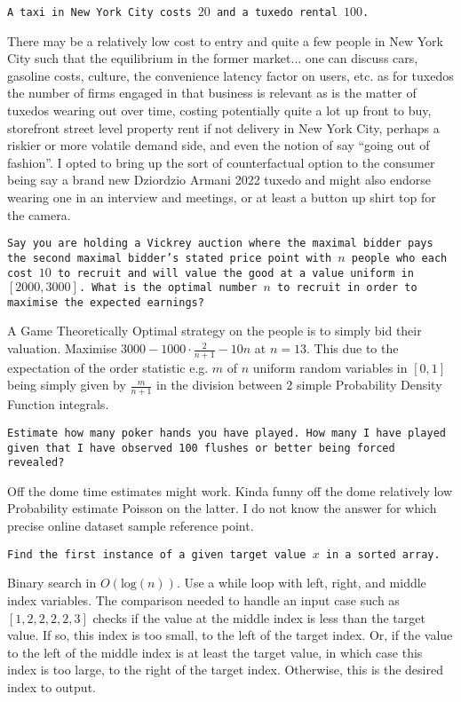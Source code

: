 \texttt{A taxi in New York City costs $20$ and a tuxedo rental $100$.}

There may be a relatively low cost to entry and quite a few people in New York City such that the equilibrium in the former market... one can discuss cars, gasoline costs, culture, the convenience latency factor on users, etc. as for tuxedos the number of firms engaged in that business is relevant as is the matter of tuxedos wearing out over time, costing potentially quite a lot up front to buy, storefront street level property rent if not delivery in New York City, perhaps a riskier or more volatile demand side, and even the notion of say ``going out of fashion''. I opted to bring up the sort of counterfactual option to the consumer being say a brand new Dziordzio Armani 2022 tuxedo and might also endorse wearing one in an interview and meetings, or at least a button up shirt top for the camera.

\texttt{Say you are holding a Vickrey auction where the maximal bidder pays the second maximal bidder's stated price point with $n$ people who each cost $10$ to recruit and will value the good at a value uniform in $[2000, 3000]$. What is the optimal number $n$ to recruit in order to maximise the expected earnings?}

A Game Theoretically Optimal strategy on the people is to simply bid their valuation. Maximise $3000 - 1000 \cdot \frac{2}{n + 1} - 10 n$ at $n = \boxed{13}$. This due to the expectation of the order statistic e.g. $m$ of $n$ uniform random variables in $[0, 1]$ being simply given by $\frac{m}{n + 1}$ in the division between $2$ simple Probability Density Function integrals.

\texttt{Estimate how many poker hands you have played. How many I have played given that I have observed 100 flushes or better being forced revealed?}

Off the dome time estimates might work. Kinda funny off the dome relatively low Probability estimate Poisson on the latter. I do not know the answer for which precise online dataset sample reference point.

\texttt{Find the first instance of a given target value $x$ in a sorted array.}

Binary search in $O(\text{log}(n))$. Use a while loop with left, right, and middle index variables. The comparison needed to handle an input case such as $[1,2,2,2,2,3]$ checks if the value at the middle index is less than the target value. If so, this index is too small, to the left of the target index. Or, if the value to the left of the middle index is at least the target value, in which case this index is too large, to the right of the target index. Otherwise, this is the desired index to output.

